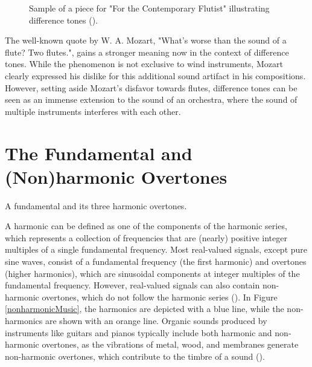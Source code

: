 \begin{figure}[h]
\centering

\caption{Sample of a piece for "For the Contemporary Flutist" illustrating difference tones (\cite{offermans_for_nodate}). }
\label{sampleDifferenceTone}  
\end{figure}






The well-known quote by W. A. Mozart, "What's worse than the sound of a flute? Two flutes.", gains a stronger meaning now in the context of difference tones. While the phenomenon is not exclusive to wind instruments, Mozart clearly expressed his dislike for this additional sound artifact in his compositions. However, setting aside Mozart's disfavor towards flutes, difference tones can be seen as an immense extension to the sound of an orchestra, where the sound of multiple instruments interferes with each other. 



\section{The Fundamental and (Non)harmonic Overtones}
\begin{marginfigure}
\centering

\vspace{0.3cm}
\caption{A fundamental and its three harmonic overtones.}
\label{harmonicMusic} 
\vspace{1cm}
\end{marginfigure}
A harmonic can be defined as one of the components of the harmonic series, which represents a collection of frequencies that are (nearly) positive integer multiples of a single fundamental frequency. Most real-valued signals, except pure sine waves, consist of a fundamental frequency (the first harmonic) and overtones (higher harmonics), which are sinusoidal components at integer multiples of the fundamental frequency. However, real-valued signals can also contain non-harmonic overtones, which do not follow the harmonic series (\cite{young_inharmonicity_1954}). In Figure \ref{nonharmonicMusic}, the harmonics are depicted with a blue line, while the non-harmonics are shown with an orange line. Organic sounds produced by instruments like guitars and pianos typically include both harmonic and non-harmonic overtones, as the vibrations of metal, wood, and membranes generate non-harmonic overtones, which contribute to the timbre of a sound (\cite{mcadams_perceptual_2019}).

